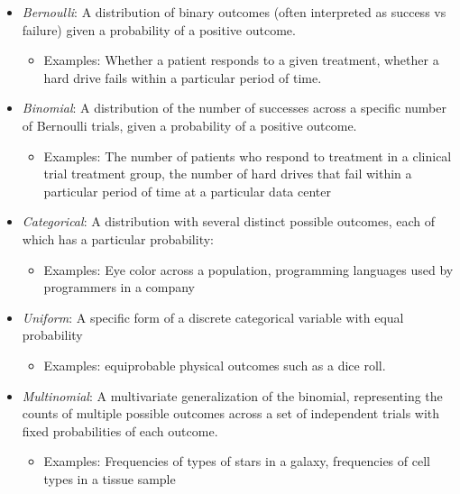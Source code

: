 \begin{itemize}
\item \textit{Bernoulli}:  A distribution of binary outcomes (often interpreted as success vs failure) given a probability of a positive outcome.

\begin{itemize}
\item Examples: Whether a patient responds to a given treatment, whether a hard drive fails within a particular period of time.
\end{itemize}


\item \textit{Binomial}: A distribution of the number of successes across a specific number of Bernoulli trials, given a probability of a positive outcome.

\begin{itemize}
\item Examples: The number of patients who respond to treatment in a clinical trial treatment group, the number of hard drives that fail within a particular period of time at a particular data center
\end{itemize}


\item \textit{Categorical}: A distribution with several distinct possible outcomes, each of which has a particular probability:

\begin{itemize}
\item Examples: Eye color across a population, programming languages used by programmers in a company
\end{itemize}


\item \textit{Uniform}: A specific form of a discrete categorical variable with equal probability

\begin{itemize}
\item Examples: equiprobable physical outcomes such as a dice roll.
\end{itemize}


\item \textit{Multinomial}: A multivariate generalization of the binomial, representing the counts of multiple possible outcomes across a set of independent trials with fixed probabilities of each outcome.

\begin{itemize}
\item Examples: Frequencies of types of stars in a galaxy, frequencies of cell types in a tissue sample
\end{itemize}
\end{itemize}

